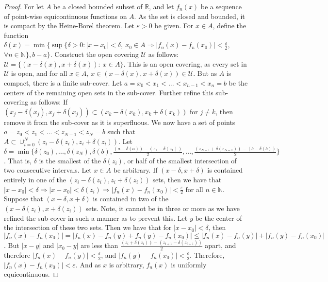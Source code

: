         \begin{proof}
            For let $A$ be a closed bounded subset
            of $\mathbb{R}$, and let $f_n(x)$ be a sequence
            of point-wise equicontinuous functions on $A$.
            As the set is closed and bounded, it is compact
            by the Heine-Borel theorem. Let $\varepsilon>0$
            be given. For $x\in A$, define the function
            $\delta(x)%
             =\min\{\sup\{\delta>0:|x-x_0|<\delta,\ x_0\in A%
              \Rightarrow |f_n(x)-f_n(x_0)|<\frac{\varepsilon}{2}$,
            $\forall n\in\mathbb{N}\},b-a\}$.
            Construct the open covering $\mathcal{U}$ as
            follows:
            $\mathcal{U}=\{(x-\delta(x),x+\delta(x)):\ x\in A\}$.
            This is an open covering, as every set in
            $\mathcal{U}$ is open, and for all
            $x\in A$, $x\in(x-\delta(x),x+\delta(x))\in\mathcal{U}$.
            But as $A$ is compact, there is a finite sub-cover.
            Let $a=x_0<x_1<...<x_{n-1}<x_n=b$ be the centers
            of the remaining open sets in the sub-cover.
            Further refine this sub-covering as follows: If
            $(x_j-\delta(x_j),x_j+\delta(x_j))%
             \subset (x_k-\delta(x_k),x_k+\delta(x_k))$
            for $j\ne k$, then remove it from the sub-cover as
            it is superfluous. We now have a set of points
            $a=z_0<z_1<...<z_{N-1}<z_N=b$ such that
            $A\subset\cup_{i=0}^{N} (z_i-\delta(z_i),z_i+\delta(z_i))$.
            Let
            $\delta%
             =\min\{\delta(z_0),...,\delta(z_N),\delta(b),%
                    \frac{(a+\delta(a))-(z_1-\delta(z_1))}{2},%
                    ...,%
                    \frac{(z_{N-1}+\delta(z_{N-1}))-(b-\delta(b))}{2}\}$.
            That is, $\delta$ is the smallest of the $\delta(z_i)$,
            or half of the smallest intersection of two consecutive
            intervals. Let $x\in A$ be arbitrary. If $(x-\delta,x+\delta)$
            is contained entirely in one of the
            $(z_i-\delta(z_i),z_i+\delta(z_i))$ sets, then we have
            that $|x-x_0|<\delta \Rightarrow |x-x_0| <\delta(z_i) \Rightarrow |f_n(x)-f_n(x_0)|<\frac{\varepsilon}{2}$ for all $n\in\mathbb{N}$.
            Suppose that $(x-\delta,x+\delta)$ is contained in two of
            the $(x-\delta(z_i),x+\delta(z_i))$ sets. Note, it cannot
            be in three or more as we have refined the sub-cover in
            such a manner as to prevent this. Let $y$ be the center
            of the intersection of these two sets. Then we have that
            for $|x-x_0|<\delta$, then
            $|f_n(x)-f_n(x_0)|%
             =|f_n(x)-f_n(y)+f_n(y)-f_n(x_0)|%
             \leq|f_n(x)-f_n(y)|+|f_n(y)-f_n(x_0)|$.
            But $|x-y|$ and $|x_0-y|$ are less than
            $\frac{(z_i + \delta(z_i))-(z_{i+1}-\delta(z_{i+1}))}{2}$
            apart, and therefore $|f_n(x)-f_n(y)|<\frac{\varepsilon}{2}$,
            and $|f_n(y)-f_n(x_0)|<\frac{\varepsilon}{2}$.
            Therefore, $|f_n(x)-f_n(x_0)|<\varepsilon$.
            And as $x$ is arbitrary,
            $f_n(x)$ is uniformly equicontinuous.
        \end{proof}
